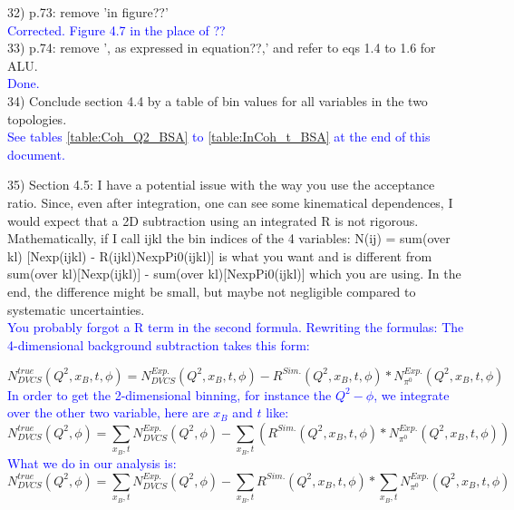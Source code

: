 32) p.73: remove 'in figure??' \\
\textcolor{blue}{ Corrected. Figure 4.7 in the 
place of ??}\\

33) p.74: remove ', as expressed in equation??,' and refer to eqs 1.4 to 1.6 
for ALU.\\
\textcolor{blue}{ Done.}\\

34) Conclude section 4.4 by a table of bin values for all variables in the two 
topologies.\\
\textcolor{blue}{ See tables \ref{table:Coh_Q2_BSA} to \ref{table:InCoh_t_BSA} 
at the end of this document. }\\
\newpage

35) Section 4.5: I have a potential issue with the way you use the acceptance 
ratio. Since, even after integration, one can see some kinematical dependences, 
I would expect that a 2D subtraction using an integrated R is not rigorous. 
Mathematically, if I call ijkl the bin indices of the 4 variables:
N(ij) = sum(over kl) [Nexp(ijkl) - R(ijkl)NexpPi0(ijkl)] is what you want and 
is different from sum(over kl)[Nexp(ijkl)] -  sum(over kl)[NexpPi0(ijkl)] which 
you are using. In the end, the difference might be small, but maybe not 
negligible compared to systematic uncertainties.\\
\textcolor{blue}{ You probably forgot a R term in the second formula. Rewriting 
the formulas: The 4-dimensional background subtraction takes this form:} 

\begin{equation}
   N_{DVCS}^{true}(Q^2, x_B, t, \phi)=   N_{DVCS}^{Exp.}(Q^2, x_B, t, \phi)  - 
R^{Sim.}(Q^2, x_B, t, \phi)* N_{\pi^{0}}^{Exp.}(Q^2, x_B, t, \phi) 
\end{equation}
\textcolor{blue}{ In order to get the 2-dimensional binning, for instance the 
$Q^2-\phi$, we integrate over the other two variable, here are $x_B$ and $t$ 
like:}
\begin{equation}
   N_{DVCS}^{true}(Q^2, \phi)=   \sum\limits_{x_B, t} N_{DVCS}^{Exp.}(Q^2, 
\phi)  - \sum\limits_{x_B, t} ( R^{Sim.}(Q^2, x_B, t, \phi)* 
N_{\pi^{0}}^{Exp.}(Q^2, x_B, t, \phi)) \end{equation}
\textcolor{blue}{ What we do in our analysis is:}
\begin{equation}
      N_{DVCS}^{true}(Q^2, \phi)=   \sum\limits_{x_B, t} N_{DVCS}^{Exp.}(Q^2, 
      \phi)  - \sum\limits_{x_B, t} R^{Sim.}(Q^2, x_B, t, \phi)* 
      \sum\limits_{x_B, t}
N_{\pi^{0}}^{Exp.}(Q^2, x_B, t, \phi) \end{equation}

